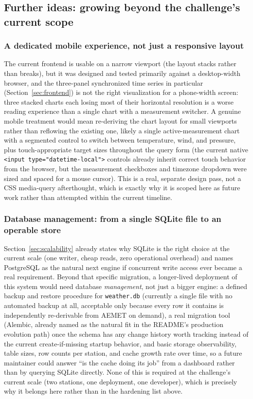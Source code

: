 \documentclass[11pt,a4paper]{article}
\begin{document}
\subsection{Further ideas: growing beyond the challenge's current scope}
\label{sec:future-extensions}

\subsubsection{A dedicated mobile experience, not just a responsive layout}

The current frontend is usable on a narrow viewport (the layout stacks
rather than breaks), but it was designed and tested primarily against a
desktop-width browser, and the three-panel synchronized time series in
particular (Section~\ref{sec:frontend}) is not the right visualization for
a phone-width screen: three stacked charts each losing most of their
horizontal resolution is a worse reading experience than a single chart
with a measurement switcher. A genuine mobile treatment would mean
re-deriving the chart layout for small viewports rather than reflowing the
existing one, likely a single active-measurement chart with a
segmented control to switch between temperature, wind, and pressure, plus
touch-appropriate target sizes throughout the query form (the current
native \texttt{<input type="datetime-local">} controls already inherit
correct touch behavior from the browser, but the measurement checkboxes
and timezone dropdown were sized and spaced for a mouse cursor). This is a
real, separate design pass, not a CSS media-query afterthought, which is
exactly why it is scoped here as future work rather than attempted within
the current timeline.

\subsubsection{Database management: from a single SQLite file to an operable store}

Section~\ref{sec:scalability} already states why SQLite is the right
choice at the current scale (one writer, cheap reads, zero operational
overhead) and names PostgreSQL as the natural next engine if concurrent
write access ever became a real requirement. Beyond that specific
migration, a longer-lived deployment of this system would need database
\emph{management}, not just a bigger engine: a defined backup and
restore procedure for \texttt{weather.db} (currently a single file with no
automated backup at all, acceptable only because every row it contains is
independently re-derivable from AEMET on demand), a real migration tool
(Alembic, already named as the natural fit in the README's production
evolution path) once the schema has any change history worth tracking
instead of the current create-if-missing startup behavior, and basic
storage observability, table sizes, row counts per station, and cache
growth rate over time, so a future maintainer could answer ``is the cache
doing its job'' from a dashboard rather than by querying SQLite directly.
None of this is required at the challenge's current scale (two stations,
one deployment, one developer), which is precisely why it belongs here
rather than in the hardening list above.
\end{document}
